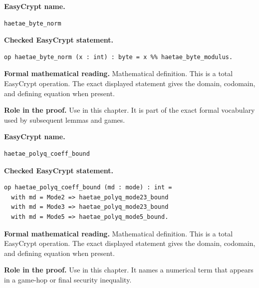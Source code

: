 \begin{formaldefinition}
\noindent\textbf{EasyCrypt name.}
\begin{lstlisting}[language=EasyCrypt,basicstyle=\ttfamily\scriptsize]
haetae_byte_norm
\end{lstlisting}
\noindent\textbf{Checked EasyCrypt statement.}
\begin{lstlisting}[language=EasyCrypt,basicstyle=\ttfamily\scriptsize]
op haetae_byte_norm (x : int) : byte = x %% haetae_byte_modulus.
\end{lstlisting}
\noindent\textbf{Formal mathematical reading.}
Mathematical definition. This is a total EasyCrypt operation.  The exact displayed statement gives the domain, codomain, and defining equation when present.

\noindent\textbf{Role in the proof.}
Use in this chapter. It is part of the exact formal vocabulary used by subsequent lemmas and games.

\end{formaldefinition}

\begin{formaldefinition}
\noindent\textbf{EasyCrypt name.}
\begin{lstlisting}[language=EasyCrypt,basicstyle=\ttfamily\scriptsize]
haetae_polyq_coeff_bound
\end{lstlisting}
\noindent\textbf{Checked EasyCrypt statement.}
\begin{lstlisting}[language=EasyCrypt,basicstyle=\ttfamily\scriptsize]
op haetae_polyq_coeff_bound (md : mode) : int =
  with md = Mode2 => haetae_polyq_mode23_bound
  with md = Mode3 => haetae_polyq_mode23_bound
  with md = Mode5 => haetae_polyq_mode5_bound.
\end{lstlisting}
\noindent\textbf{Formal mathematical reading.}
Mathematical definition. This is a total EasyCrypt operation.  The exact displayed statement gives the domain, codomain, and defining equation when present.

\noindent\textbf{Role in the proof.}
Use in this chapter. It names a numerical term that appears in a game-hop or final security inequality.

\end{formaldefinition}

